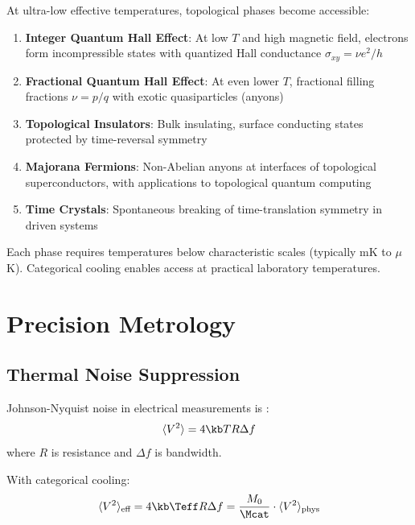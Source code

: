 At ultra-low effective temperatures, topological phases become accessible:

\begin{enumerate}
    \item \textbf{Integer Quantum Hall Effect}: At low $T$ and high magnetic field, electrons form incompressible states with quantized Hall conductance $\sigma_{xy} = \nu e^2/h$ \cite{klitzing1980}

    \item \textbf{Fractional Quantum Hall Effect}: At even lower $T$, fractional filling fractions $\nu = p/q$ with exotic quasiparticles (anyons) \cite{tsui1982,laughlin1983}

    \item \textbf{Topological Insulators}: Bulk insulating, surface conducting states protected by time-reversal symmetry \cite{kane2005,bernevig2006}

    \item \textbf{Majorana Fermions}: Non-Abelian anyons at interfaces of topological superconductors, with applications to topological quantum computing \cite{kitaev2001,nayak2008}

    \item \textbf{Time Crystals}: Spontaneous breaking of time-translation symmetry in driven systems \cite{wilczek2012,zhang2017}
\end{enumerate}

Each phase requires temperatures below characteristic scales (typically mK to $\mu$K). Categorical cooling enables access at practical laboratory temperatures.

\section{Precision Metrology}

\subsection{Thermal Noise Suppression}

Johnson-Nyquist noise in electrical measurements is \cite{johnson1928,nyquist1928}:
\begin{equation}
\langle V^2 \rangle = 4\kb T R \Delta f
\label{eq:johnson_noise}
\end{equation}
where $R$ is resistance and $\Delta f$ is bandwidth.

With categorical cooling:
\begin{equation}
\langle V^2 \rangle_{\text{eff}} = 4\kb \Teff R \Delta f = \frac{M_0}{\Mcat} \cdot \langle V^2 \rangle_{\text{phys}}
\label{eq:cat_noise}
\end{equation}

